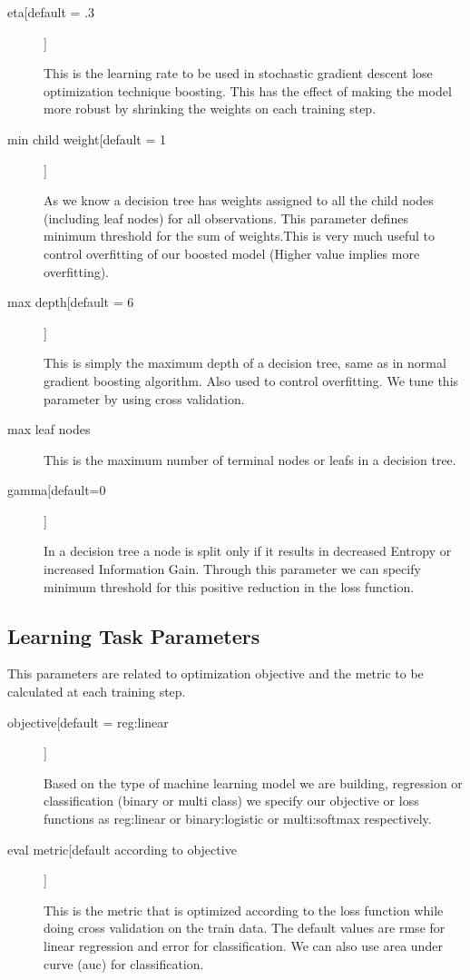 \begin{description}
\item[eta[default = .3]]

This is the learning rate to be used in stochastic gradient descent lose
optimization  technique boosting. This has the effect of making the model more
robust by shrinking the  weights on each training step.

\item[min child weight[default = 1]] 

As we know a decision tree has weights assigned to all the child nodes
(including leaf nodes) for all observations. This parameter defines minimum
threshold for the sum of  weights.This is very much useful to control
overfitting of our boosted model  (Higher  value implies more overfitting).

\item[max depth[default = 6]]

This is simply the maximum depth of a decision tree, same as in normal gradient
boosting  algorithm. Also used to control overfitting. We tune this parameter 
by using cross validation.

\item[max leaf nodes]

This is the maximum number of terminal nodes or leafs in a decision tree.

\item[gamma[default=0]]

In a decision tree a node is split only if it results in decreased Entropy or
increased  Information Gain. Through this parameter  we can specify minimum
threshold for this positive  reduction in the loss function.

\end{description}

\subsection{Learning Task Parameters} 

This parameters are related to optimization objective and the metric to be
calculated at each training step.

\begin{description}

\item[objective[default = reg:linear]]

Based on the type of machine learning model we are building, regression or
classification (binary or multi class) we specify our objective or loss
functions as reg:linear or binary:logistic or  multi:softmax respectively.

\item[eval metric[default according to objective]]

This is the metric that is optimized according to the loss function while
doing cross  validation on the train data. The default values are rmse for
linear regression and  error  for classification. We can also use area under
curve (auc) for classification.

\end{description}

